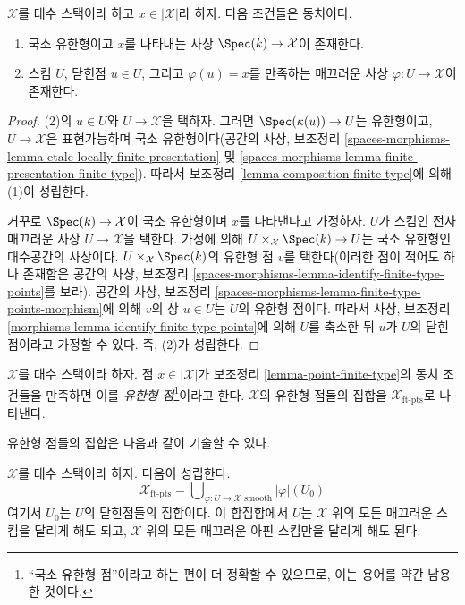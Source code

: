 \begin{lemma}
\label{lemma-point-finite-type}
$\mathcal{X}$를 대수 스택이라 하고 $x \in |\mathcal{X}|$라 하자.
다음 조건들은 동치이다.
\begin{enumerate}
\item 국소 유한형이고 $x$를 나타내는 사상
$\Spec(k) \to \mathcal{X}$이 존재한다.
\item 스킴 $U$, 닫힌점 $u \in U$, 그리고 $\varphi(u) = x$를 만족하는
매끄러운 사상 $\varphi : U \to \mathcal{X}$이 존재한다.
\end{enumerate}
\end{lemma}

\begin{proof}
(2)의 $u \in U$와 $U \to \mathcal{X}$을 택하자. 그러면
$\Spec(\kappa(u)) \to U$는 유한형이고, $U \to \mathcal{X}$은
표현가능하며 국소 유한형이다(공간의 사상,
보조정리 \ref{spaces-morphisms-lemma-etale-locally-finite-presentation} 및
\ref{spaces-morphisms-lemma-finite-presentation-finite-type}).
따라서 보조정리 \ref{lemma-composition-finite-type}에 의해 (1)이 성립한다.

\medskip\noindent
거꾸로 $\Spec(k) \to \mathcal{X}$이 국소 유한형이며 $x$를 나타낸다고
가정하자. $U$가 스킴인 전사 매끄러운 사상 $U \to \mathcal{X}$을 택한다.
가정에 의해 $U \times_\mathcal{X} \Spec(k) \to U$는 국소 유한형인
대수공간의 사상이다. $U \times_\mathcal{X} \Spec(k)$의 유한형 점 $v$를
택한다(이러한 점이 적어도 하나 존재함은 공간의 사상,
보조정리 \ref{spaces-morphisms-lemma-identify-finite-type-points}를 보라).
공간의 사상,
보조정리 \ref{spaces-morphisms-lemma-finite-type-points-morphism}에 의해
$v$의 상 $u \in U$는 $U$의 유한형 점이다.
따라서 사상, 보조정리 \ref{morphisms-lemma-identify-finite-type-points}에
의해 $U$를 축소한 뒤 $u$가 $U$의 닫힌점이라고 가정할 수 있다.
즉, (2)가 성립한다.
\end{proof}

\begin{definition}
\label{definition-finite-type-point}
$\mathcal{X}$를 대수 스택이라 하자. 점 $x \in |\mathcal{X}|$가
보조정리 \ref{lemma-point-finite-type}의 동치 조건들을 만족하면 이를
{\it 유한형 점}\footnote{``국소 유한형 점''이라고 하는 편이 더 정확할
수 있으므로, 이는 용어를 약간 남용한 것이다.}이라고 한다.
$\mathcal{X}$의 유한형 점들의 집합을
$\mathcal{X}_{\text{ft-pts}}$로 나타낸다.
\end{definition}

\noindent
유한형 점들의 집합은 다음과 같이 기술할 수 있다.

\begin{lemma}
\label{lemma-identify-finite-type-points}
$\mathcal{X}$를 대수 스택이라 하자. 다음이 성립한다.
$$
\mathcal{X}_{\text{ft-pts}} =
\bigcup\nolimits_{\varphi : U \to \mathcal{X}\text{ smooth}} |\varphi|(U_0)
$$
여기서 $U_0$는 $U$의 닫힌점들의 집합이다.
이 합집합에서 $U$는 $\mathcal{X}$ 위의 모든 매끄러운 스킴을
달리게 해도 되고, $\mathcal{X}$ 위의 모든 매끄러운 아핀 스킴만을
달리게 해도 된다.
\end{lemma}


